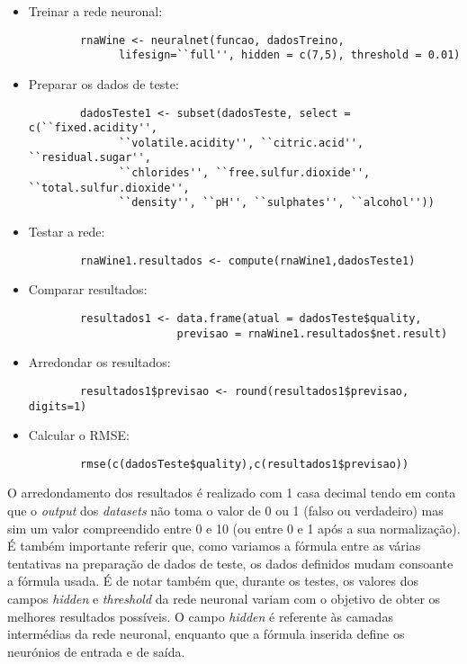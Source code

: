 \documentclass{article}
\begin{document}
\begin{itemize}
    \item Treinar a rede neuronal:
        \begin{verbatim}
        rnaWine <- neuralnet(funcao, dadosTreino, 
              lifesign=``full'', hidden = c(7,5), threshold = 0.01)
        \end{verbatim}
    \item Preparar os dados de teste: 
        \begin{verbatim}
        dadosTeste1 <- subset(dadosTeste, select = c(``fixed.acidity'', 
              ``volatile.acidity'', ``citric.acid'', ``residual.sugar'', 
              ``chlorides'', ``free.sulfur.dioxide'', ``total.sulfur.dioxide'', 
              ``density'', ``pH'', ``sulphates'', ``alcohol''))
        \end{verbatim}
    \item Testar a rede:
        \begin{verbatim}
        rnaWine1.resultados <- compute(rnaWine1,dadosTeste1)
        \end{verbatim}
    \item Comparar resultados:
        \begin{verbatim}
        resultados1 <- data.frame(atual = dadosTeste$quality, 
                       previsao = rnaWine1.resultados$net.result)
        \end{verbatim}
    \item Arredondar os resultados:
        \begin{verbatim}
        resultados1$previsao <- round(resultados1$previsao, digits=1)
        \end{verbatim}
    \item Calcular o RMSE:
        \begin{verbatim}
        rmse(c(dadosTeste$quality),c(resultados1$previsao))
        \end{verbatim}
\end{itemize}

O arredondamento dos resultados é realizado com 1 casa decimal tendo em conta que o \textit{output} dos \textit{datasets} não toma o valor de 0 ou 1 (falso ou verdadeiro) mas sim um valor compreendido entre 0 e 10 (ou entre 0 e 1 após a sua normalização).\\
É também importante referir que, como variamos a fórmula entre as várias tentativas na preparação de dados de teste, os dados definidos mudam consoante a fórmula usada. É de notar também que, durante os testes, os valores dos campos \textit{hidden} e \textit{threshold} da rede neuronal variam com o objetivo de obter os melhores resultados possíveis.
O campo \textit{hidden} é referente às camadas intermédias da rede neuronal, enquanto que a fórmula inserida define os neurónios de entrada e de saída.
\end{document}
